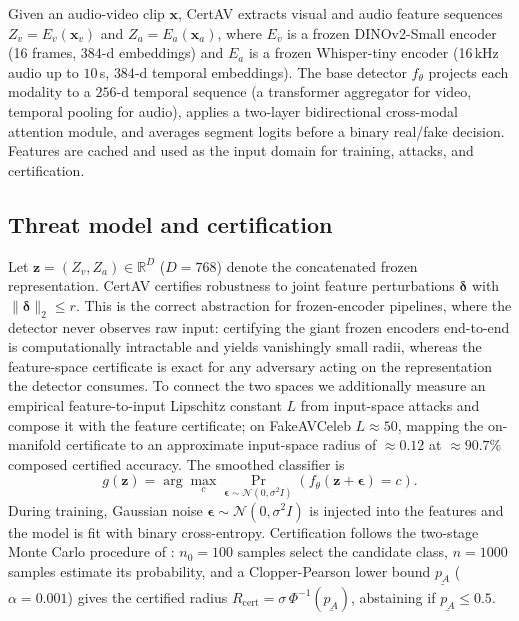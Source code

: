 \documentclass{article}
\def\z{{\mathbf z}}
\def\x{{\mathbf x}}
\def\eps{{\boldsymbol \epsilon}}
\def\del{{\boldsymbol \delta}}
\newcommand{\Rcert}{R_{\mathrm{cert}}}
\newcommand{\punder}{\underline{p_A}}
\begin{document}
Given an audio-video clip $\x$, CertAV extracts visual and audio feature sequences $Z_v = E_v(\x_v)$ and $Z_a = E_a(\x_a)$, where $E_v$ is a frozen DINOv2-Small encoder (16 frames, $384$-d embeddings) and $E_a$ is a frozen Whisper-tiny encoder (16\,kHz audio up to $10$\,s, $384$-d temporal embeddings). The base detector $f_\theta$ projects each modality to a $256$-d temporal sequence (a transformer aggregator for video, temporal pooling for audio), applies a two-layer bidirectional cross-modal attention module, and averages segment logits before a binary real/fake decision. Features are cached and used as the input domain for training, attacks, and certification.

\subsection{Threat model and certification}
\label{ssec:threat}

Let $\z=(Z_v,Z_a)\in\mathbb{R}^D$ ($D=768$) denote the concatenated frozen representation. CertAV certifies robustness to joint feature perturbations $\del$ with $\|\del\|_2\le r$. This is the correct abstraction for frozen-encoder pipelines, where the detector never observes raw input: certifying the giant frozen encoders end-to-end is computationally intractable and yields vanishingly small radii, whereas the feature-space certificate is exact for any adversary acting on the representation the detector consumes. To connect the two spaces we additionally measure an empirical feature-to-input Lipschitz constant $L$ from input-space attacks and compose it with the feature certificate; on FakeAVCeleb $L\!\approx\!50$, mapping the on-manifold certificate to an approximate input-space radius of $\approx\!0.12$ at $\approx\!90.7\%$ composed certified accuracy. The smoothed classifier is
\begin{equation}
  g(\z)=\arg\max_c \Pr_{\eps\sim\mathcal{N}(0,\sigma^2 I)}\!\left(f_\theta(\z+\eps)=c\right).
\end{equation}
During training, Gaussian noise $\eps\sim\mathcal{N}(0,\sigma^2 I)$ is injected into the features and the model is fit with binary cross-entropy. Certification follows the two-stage Monte Carlo procedure of \cite{cohen2019certified}: $n_0=100$ samples select the candidate class, $n=1000$ samples estimate its probability, and a Clopper-Pearson lower bound $\punder$ ($\alpha=0.001$) gives the certified radius $\Rcert=\sigma\,\Phi^{-1}(\punder)$, abstaining if $\punder\le 0.5$.
\end{document}
